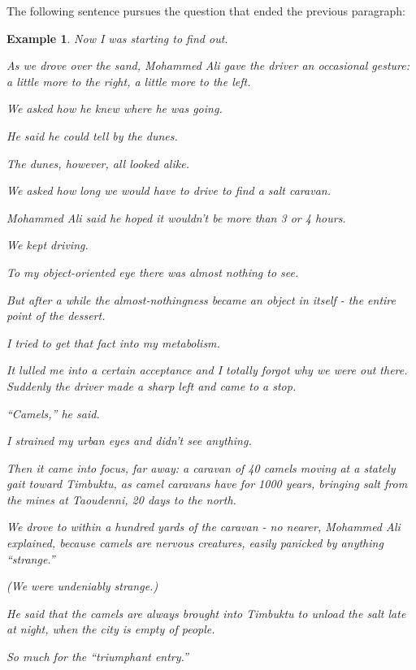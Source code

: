 \documentclass{book}
\numberwithin{equation}{section}
\newtheorem{example}{Example}[chapter]
\begin{document}
The following sentence pursues the question that ended the previous paragraph:
\begin{example}
    Now I was starting to find out.
    
    As we drove over the sand, Mohammed Ali gave the driver an occasional gesture: a little more to the right, a little more to the left.
    
    We asked how he knew where he was going.
    
    He said he could tell by the dunes.
    
    The dunes, however, all looked alike.
    
    We asked how long we would have to drive to find a salt caravan.
    
    Mohammed Ali said he hoped it wouldn't be more than 3 or 4 hours.
    
    We kept driving.
    
    To my object-oriented eye there was almost nothing to see.
    
    But after a while the almost-nothingness became an object in itself - the entire point of the dessert.
    
    I tried to get that fact into my metabolism.
    
    It lulled me into a certain acceptance and I totally forgot why we were out there.
    \\
    
    Suddenly the driver made a sharp left and came to a stop.
    
    ``Camels,'' he said.
    
    I strained my urban eyes and didn't see anything.
    
    Then it came into focus, far away: a caravan of 40 camels moving at a stately gait toward Timbuktu, as camel caravans have for 1000 years, bringing salt from the mines at Taoudenni, 20 days to the north.
    
    We drove to within a hundred yards of the caravan - no nearer, Mohammed Ali explained, because camels are nervous creatures, easily panicked by anything ``strange.''
    
    (We were undeniably strange.)
    
    He said that the camels are always brought into Timbuktu to unload the salt late at night, when the city is empty of people.
    
    So much for the ``triumphant entry.''
    \\
    

\end{example}
\end{document}
